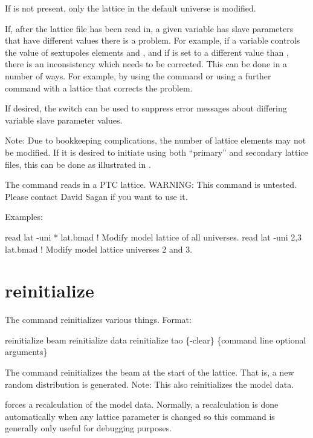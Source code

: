 If  is not present, only the  lattice
in the default universe is modified.

If, after the lattice file has been read in, a given \tao variable has slave parameters that have
different values there is a problem. For example, if a \tao variable controls the  value of
sextupoles elements  and , and if  is set to a different value than ,
there is an inconsistency which needs to be corrected. This can be done in a number of ways. For
example, by using the  command or using a further  command with
a lattice that corrects the problem.

If desired, the  switch can be used to suppress error messages about differing \tao
variable slave parameter values.

Note: Due to bookkeeping complications, the number of lattice elements may not be modified. If it is
desired to initiate \tao using both ``primary'' and secondary lattice files, this can be done as
illustrated in .

The  command reads in a PTC lattice. WARNING: This command is untested. Please contact
David Sagan if you want to use it.

Examples:
\begin{example}
  read lat -uni * lat.bmad   ! Modify model lattice of all universes.
  read lat -uni 2,3 lat.bmad ! Modify model lattice universes 2 and 3.
\end{example}

\section{reinitialize}
\label{s:reinit}

The  command reinitializes various things. Format:
\begin{example}
  reinitialize beam
  reinitialize data
  reinitialize tao \{-clear\} \{command line optional arguments\}
\end{example}

\vskip 10pt 

The  command reinitializes the beam at the start of the lattice. That is, a
new random distribution is generated.  Note: This also reinitializes the model data.

 forces a recalculation of the model data.  Normally, a recalculation is done
automatically when any lattice parameter is changed so this command is generally only useful for
debugging purposes.

